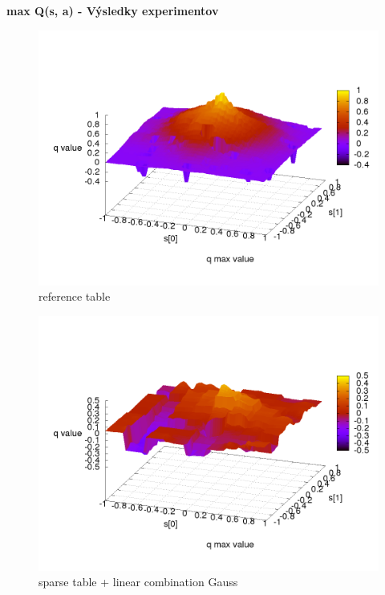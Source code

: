 \documentclass[xcolor=dvipsnames]{beamer}
\begin{document}
\begin{frame}{\bf max Q(s, a) - Výsledky experimentov}

\begin{minipage}{.5\textwidth}

\begin{figure}[!htb]
\centering
\includegraphics[scale=.2]{../../results_q_learning/map_1/function_type_0/iterations_10/q_learning_result.png}
\caption{reference table}
\end{figure}

\end{minipage}%
\begin{minipage}{.5\textwidth}

\begin{figure}[!htb]
\centering
\includegraphics[scale=.2]{../../results_q_learning/map_1/function_type_3/iterations_10/q_learning_result.png}
\caption{sparse table + linear combination Gauss}
\end{figure}


\end{minipage}
\end{frame}
\end{document}
